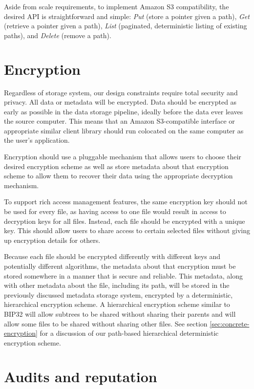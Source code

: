 \documentclass[11pt,fleqn,openany]{book}
\begin{document}
Aside from scale requirements, to implement Amazon S3 compatibility,
the desired API is straightforward and
simple: {\em Put} (store a pointer given a path), {\em Get} (retrieve a pointer
given a path),
{\em List} (paginated, deterministic listing of existing paths), and {\em Delete}
(remove a path).

\section{Encryption}

Regardless of storage system, our design constraints require total security
and privacy. All data or metadata will be encrypted.
Data should be encrypted as early as possible in the data storage pipeline,
ideally before the data ever leaves the source computer. This means that an
Amazon S3-compatible interface or appropriate similar client library should run
colocated on the same computer as the user's application.

Encryption should use a pluggable mechanism that allows users to choose their
desired encryption scheme as well as store metadata about that encryption
scheme to allow them to recover their data using the appropriate decryption
mechanism.

To support rich access management features, the same encryption key should not
be used for every file, as having access to one file would result in access
to decryption keys for all files. Instead, each file should be encrypted with
a unique key. This should allow users to share access to certain selected files
without giving up encryption details for others.

Because each file should be encrypted differently with different keys and
potentially different algorithms, the metadata about that encryption must
be stored somewhere in a manner that is secure and reliable. This metadata,
along with other metadata about the file, including its path, will
be stored in the previously discussed metadata storage system, encrypted
by a deterministic, hierarchical encryption scheme.
A hierarchical encryption scheme similar to
BIP32 \cite{bip32} will allow subtrees to be shared without sharing their
parents and will allow some files to be shared without sharing other files.
See section \ref{sec:concrete-encryption} for a discussion of our path-based
hierarchical deterministic encryption scheme.

\section{Audits and reputation}\label{sec:framework-audits}
\end{document}

